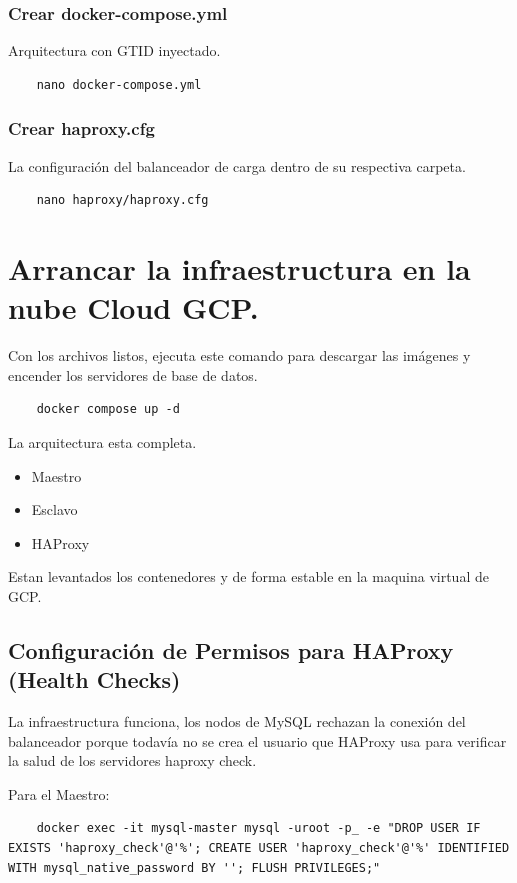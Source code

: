 \documentclass[10pt,a4paper]{article}
\begin{document}
\vspace{2mm}

\subsubsection{Crear docker-compose.yml}
Arquitectura con GTID inyectado.
\begin{lstlisting}
    nano docker-compose.yml
\end{lstlisting}

\subsubsection{Crear haproxy.cfg}
La configuración del balanceador de carga dentro de su respectiva carpeta.
\begin{lstlisting}
    nano haproxy/haproxy.cfg
\end{lstlisting}

\section{Arrancar la infraestructura en la nube Cloud GCP.}
Con los archivos listos, ejecuta este comando para descargar las imágenes y encender los servidores de base de datos.
\begin{lstlisting}
    docker compose up -d
\end{lstlisting}

\vspace{2mm}

La arquitectura esta completa.
\begin{itemize}
    \item Maestro
    \item Esclavo
    \item HAProxy
\end{itemize}
Estan levantados los contenedores y de forma estable en la maquina 
virtual de GCP.

\subsection{Configuración de Permisos para HAProxy (Health Checks)}

La infraestructura funciona, los nodos de MySQL rechazan 
la conexión del balanceador porque todavía no se crea 
el usuario que HAProxy usa para verificar la salud de los 
servidores haproxy check.

Para el Maestro:
\begin{lstlisting}
    docker exec -it mysql-master mysql -uroot -p_ -e "DROP USER IF EXISTS 'haproxy_check'@'%'; CREATE USER 'haproxy_check'@'%' IDENTIFIED WITH mysql_native_password BY ''; FLUSH PRIVILEGES;"
\end{lstlisting}
\end{document}
